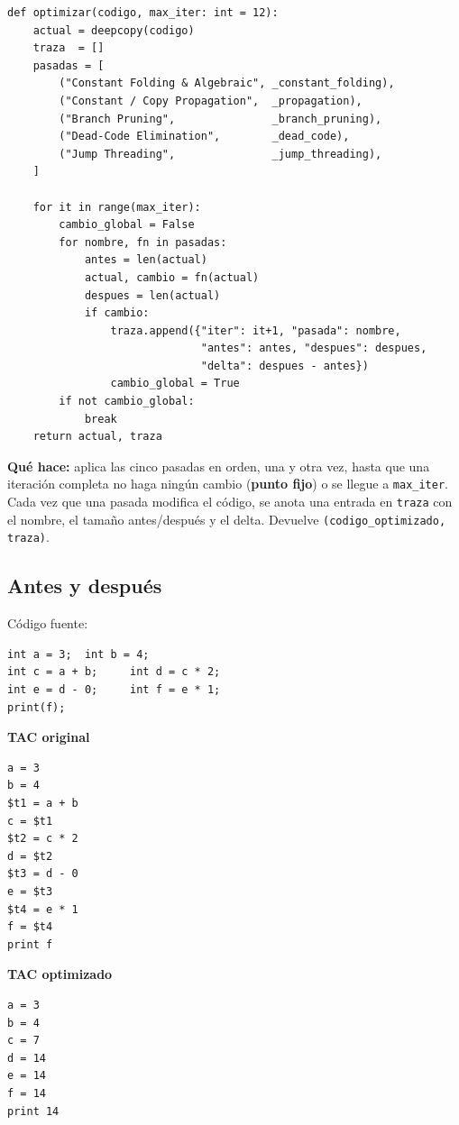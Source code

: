 \documentclass[11pt,a4paper]{article}
\begin{document}
\begin{lstlisting}[style=py]
def optimizar(codigo, max_iter: int = 12):
    actual = deepcopy(codigo)
    traza  = []
    pasadas = [
        ("Constant Folding & Algebraic", _constant_folding),
        ("Constant / Copy Propagation",  _propagation),
        ("Branch Pruning",               _branch_pruning),
        ("Dead-Code Elimination",        _dead_code),
        ("Jump Threading",               _jump_threading),
    ]

    for it in range(max_iter):
        cambio_global = False
        for nombre, fn in pasadas:
            antes = len(actual)
            actual, cambio = fn(actual)
            despues = len(actual)
            if cambio:
                traza.append({"iter": it+1, "pasada": nombre,
                              "antes": antes, "despues": despues,
                              "delta": despues - antes})
                cambio_global = True
        if not cambio_global:
            break
    return actual, traza
\end{lstlisting}

\textbf{Qué hace:} aplica las cinco pasadas en orden, una y otra vez, hasta
que una iteración completa no haga ningún cambio (\textbf{punto fijo}) o
se llegue a \texttt{max\_iter}. Cada vez que una pasada modifica el
código, se anota una entrada en \texttt{traza} con el nombre, el tamaño
antes/después y el delta. Devuelve \texttt{(codigo\_optimizado, traza)}.

\subsection{Antes y después}

Código fuente:

\begin{lstlisting}[style=tac]
int a = 3;  int b = 4;
int c = a + b;     int d = c * 2;
int e = d - 0;     int f = e * 1;
print(f);
\end{lstlisting}

\begin{minipage}[t]{0.48\textwidth}
\textbf{TAC original}
\begin{lstlisting}[style=tac,basicstyle=\ttfamily\footnotesize\color{verdeTAC}]
a = 3
b = 4
$t1 = a + b
c = $t1
$t2 = c * 2
d = $t2
$t3 = d - 0
e = $t3
$t4 = e * 1
f = $t4
print f
\end{lstlisting}
\end{minipage}\hfill
\begin{minipage}[t]{0.48\textwidth}
\textbf{TAC optimizado}
\begin{lstlisting}[style=tac,basicstyle=\ttfamily\footnotesize\color{rojoOpt}]
a = 3
b = 4
c = 7
d = 14
e = 14
f = 14
print 14
\end{lstlisting}
\end{minipage}
\end{document}
